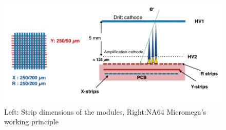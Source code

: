 \begin{figure}[t!]
\centering
\includegraphics[width=\textwidth]{thesis_figures/NA64_MM.png}
\caption{Left: Strip dimensions of the modules, Right:NA64 Micromega's working principle~\cite{}}
\label{fig:Micromegas_na64}
\end{figure}

